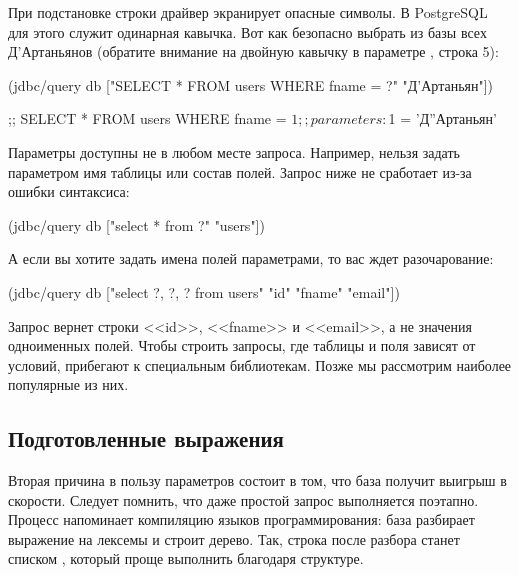 При подстановке строки драйвер экранирует опасные символы. В PostgreSQL для этого служит одинарная кавычка. Вот как безопасно выбрать из базы всех Д'Артаньянов (обратите внимание на двойную кавычку в параметре , строка 5):

  \begin{clojure/lines}
(jdbc/query db
  ["SELECT * FROM users WHERE fname = ?" "Д'Артаньян"])

;; SELECT * FROM users WHERE fname = $1
;; parameters: $1 = 'Д''Артаньян'
  \end{clojure/lines}

Параметры доступны не в любом месте запроса. Например, нельзя задать параметром имя таблицы или состав полей. Запрос ниже не сработает из-за ошибки синтаксиса:

\begin{english}
  \begin{clojure}
(jdbc/query db ["select * from ?" "users"])
  \end{clojure}
\end{english}

А если вы хотите задать имена полей параметрами, то вас ждет разочарование:

\begin{english}
  \begin{clojure}
(jdbc/query db
  ["select ?, ?, ? from users" "id" "fname" "email"])
  \end{clojure}
\end{english}

Запрос вернет строки <<id>>, <<fname>> и <<email>>, а не значения одноименных полей. Чтобы строить запросы, где таблицы и поля зависят от условий, прибегают к специальным библиотекам. Позже мы рассмотрим наиболее популярные из них.

\subsection{Подготовленные выражения}


Вторая причина в пользу параметров состоит в том, что база получит выигрыш в скорости. Следует помнить, что даже простой запрос выполняется поэтапно. Процесс напоминает компиляцию языков программирования: база разбирает выражение на лексемы и строит дерево. Так, строка  после разбора станет списком , который проще выполнить благодаря структуре.

